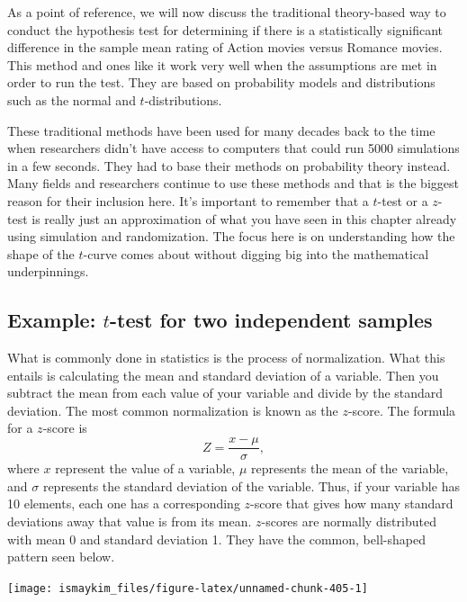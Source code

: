 \documentclass[12pt,]{krantz}
\theoremstyle{definition}
\theoremstyle{definition}
\theoremstyle{definition}
\theoremstyle{remark}
\begin{document}
As a point of reference, we will now discuss the traditional
theory-based way to conduct the hypothesis test for determining if there
is a statistically significant difference in the sample mean rating of
Action movies versus Romance movies. This method and ones like it work
very well when the assumptions are met in order to run the test. They
are based on probability models and distributions such as the normal and
\(t\)-distributions.

These traditional methods have been used for many decades back to the
time when researchers didn't have access to computers that could run
5000 simulations in a few seconds. They had to base their methods on
probability theory instead. Many fields and researchers continue to use
these methods and that is the biggest reason for their inclusion here.
It's important to remember that a \(t\)-test or a \(z\)-test is really
just an approximation of what you have seen in this chapter already
using simulation and randomization. The focus here is on understanding
how the shape of the \(t\)-curve comes about without digging big into
the mathematical underpinnings.

\subsection{\texorpdfstring{Example: \(t\)-test for two independent
samples}{Example: t-test for two independent samples}}\label{example-t-test-for-two-independent-samples}

What is commonly done in statistics is the process of normalization.
What this entails is calculating the mean and standard deviation of a
variable. Then you subtract the mean from each value of your variable
and divide by the standard deviation. The most common normalization is
known as the \(z\)-score. The formula for a \(z\)-score is
\[Z = \frac{x - \mu}{\sigma},\] where \(x\) represent the value of a
variable, \(\mu\) represents the mean of the variable, and \(\sigma\)
represents the standard deviation of the variable. Thus, if your
variable has 10 elements, each one has a corresponding \(z\)-score that
gives how many standard deviations away that value is from its mean.
\(z\)-scores are normally distributed with mean 0 and standard deviation
1. They have the common, bell-shaped pattern seen below.

\begin{center}\texttt{[image: ismaykim\_files/figure-latex/unnamed-chunk-405-1]} \end{center}
\end{document}
